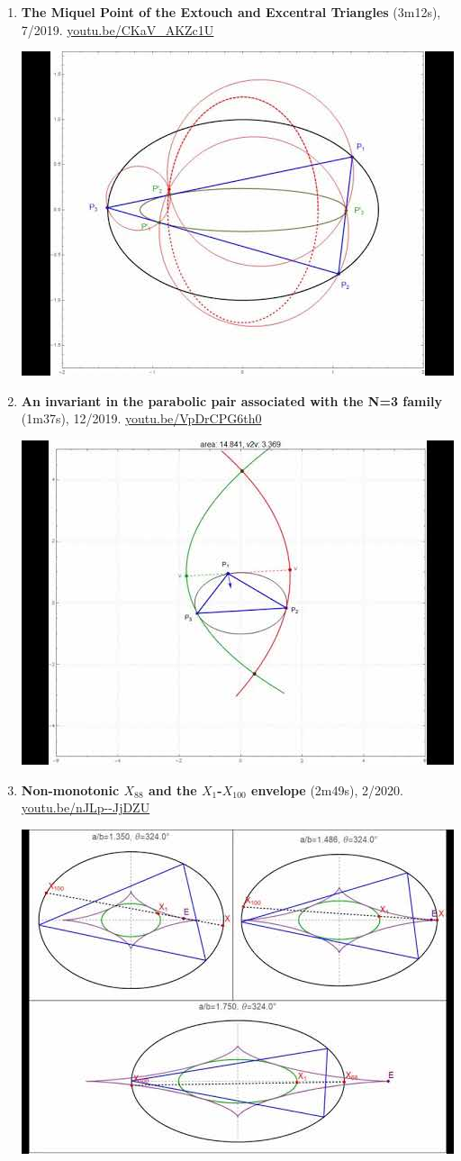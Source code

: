 \documentclass[12pt]{article}
\begin{document}
\begin{enumerate}[resume]
% 
\item \textbf{The Miquel Point of the Extouch and Excentral Triangles} (3m12s), 7/2019. \href{https://youtu.be/CKaV_AKZc1U}{\url{youtu.be/CKaV\_AKZc1U}}
\begin{center}\includegraphics[width=.5\textwidth]{pics/CKaV_AKZc1U.jpg}\end{center}
% 
\item \textbf{An invariant in the parabolic pair associated with the N=3 family} (1m37s), 12/2019. \href{https://youtu.be/VpDrCPG6th0}{\url{youtu.be/VpDrCPG6th0}}
\begin{center}\includegraphics[width=.5\textwidth]{pics/VpDrCPG6th0.jpg}\end{center}
% 
\item \textbf{Non-monotonic $X_{88}$ and the $X_{1}$-$X_{100}$ envelope} (2m49s), 2/2020. \href{https://youtu.be/nJLp--JjDZU}{\url{youtu.be/nJLp--JjDZU}}
\begin{center}\includegraphics[width=.5\textwidth]{pics/nJLp--JjDZU.jpg}\end{center}

\end{enumerate}
\end{document}

